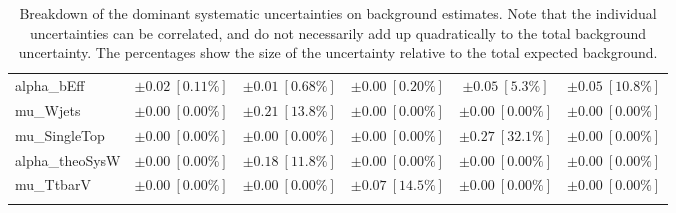 \begin{sidewaystable}
\begin{center}
\begin{tabular*}{\textwidth}{@{\extracolsep{\fill}}lccccc}
alpha\_bEff         & $\pm 0.02\ [0.11\%] $          & $\pm 0.01\ [0.68\%] $          & $\pm 0.00\ [0.20\%] $          & $\pm 0.05\ [5.3\%] $          & $\pm 0.05\ [10.8\%] $       \\
mu\_Wjets         & $\pm 0.00\ [0.00\%] $          & $\pm 0.21\ [13.8\%] $          & $\pm 0.00\ [0.00\%] $          & $\pm 0.00\ [0.00\%] $          & $\pm 0.00\ [0.00\%] $       \\
mu\_SingleTop         & $\pm 0.00\ [0.00\%] $          & $\pm 0.00\ [0.00\%] $          & $\pm 0.00\ [0.00\%] $          & $\pm 0.27\ [32.1\%] $          & $\pm 0.00\ [0.00\%] $       \\
alpha\_theoSysW         & $\pm 0.00\ [0.00\%] $          & $\pm 0.18\ [11.8\%] $          & $\pm 0.00\ [0.00\%] $          & $\pm 0.00\ [0.00\%] $          & $\pm 0.00\ [0.00\%] $       \\
mu\_TtbarV         & $\pm 0.00\ [0.00\%] $          & $\pm 0.00\ [0.00\%] $          & $\pm 0.07\ [14.5\%] $          & $\pm 0.00\ [0.00\%] $          & $\pm 0.00\ [0.00\%] $       \\
\noalign{\smallskip}\hline\noalign{\smallskip}
\end{tabular*}
\end{center}
\caption[Breakdown of uncertainty on background estimates]{
Breakdown of the dominant systematic uncertainties on background estimates.
Note that the individual uncertainties can be correlated, and do not necessarily add up quadratically to 
the total background uncertainty. The percentages show the size of the uncertainty relative to the total expected background.
\label{table.results.bkgestimate.uncertainties.SRC3_bybkg}}
\end{sidewaystable}
%

